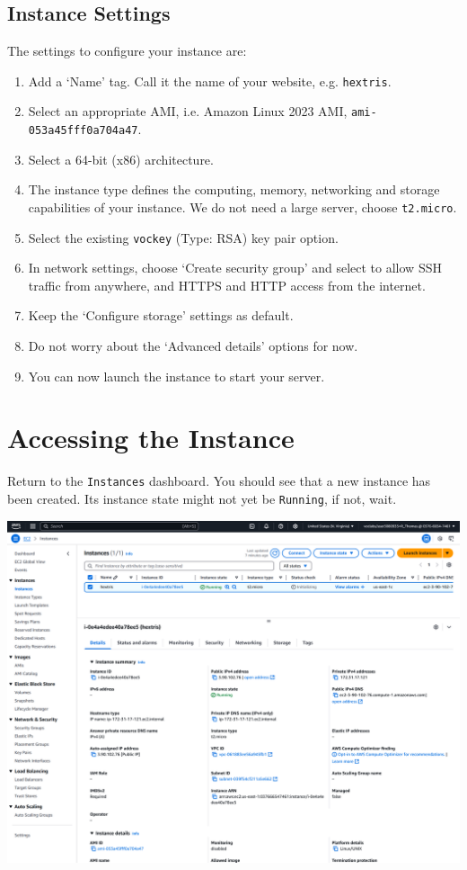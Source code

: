 \documentclass{csse4400}
\begin{document}
\subsection{Instance Settings}
The settings to configure your instance are:
\begin{enumerate}
\item Add a `Name' tag. Call it the name of your website, e.g. \texttt{hextris}.
\item Select an appropriate AMI, i.e. Amazon Linux 2023 AMI, \texttt{ami-053a45fff0a704a47}.
\item Select a 64-bit (x86) architecture.
\item The instance type defines the computing, memory, networking and storage capabilities of your instance. We do not need a large server, choose \texttt{t2.micro}.
\item Select the existing \texttt{vockey} (Type: RSA) key pair option.
\item In network settings, choose `Create security group' and select to allow SSH traffic from anywhere, and HTTPS and HTTP access from the internet.
\item Keep the `Configure storage' settings as default.
\item Do not worry about the `Advanced details' options for now.
\item You can now launch the instance to start your server.
\end{enumerate}

 
\section{Accessing the Instance}

Return to the \texttt{Instances} dashboard.
You should see that a new instance has been created.
Its instance state might not yet be \texttt{Running}, if not, wait.

\vspace{3mm}
\noindent
\includegraphics[width=\textwidth]{images/instance-interface}
\vspace{3mm}
\end{document}
